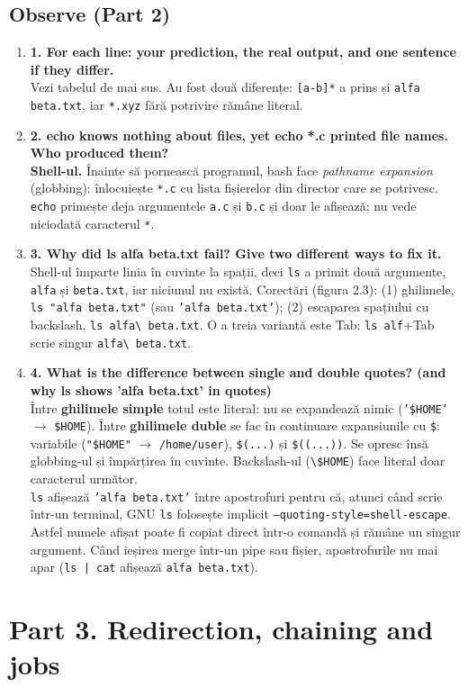 \documentclass[12pt,a4paper]{article}
\newcommand{\Q}[2]{\item \textbf{#1}\\ #2}
\begin{document}
\subsection*{Observe (Part 2)}
\begin{enumerate}
\Q{1. For each line: your prediction, the real output, and one sentence if they differ.}
{Vezi tabelul de mai sus. Au fost două diferențe: \texttt{[a-b]*} a prins și \texttt{alfa beta.txt}, iar \texttt{*.xyz} fără potrivire rămâne literal.}
\Q{2. echo knows nothing about files, yet echo *.c printed file names. Who produced them?}
{\textbf{Shell-ul.} Înainte să pornească programul, bash face \emph{pathname expansion} (globbing): înlocuiește \texttt{*.c} cu lista fișierelor din director care se potrivesc. \texttt{echo} primește deja argumentele \texttt{a.c} și \texttt{b.c} și doar le afișează; nu vede niciodată caracterul \texttt{*}.}
\Q{3. Why did ls alfa beta.txt fail? Give two different ways to fix it.}
{Shell-ul împarte linia în cuvinte la spații, deci \texttt{ls} a primit două argumente, \texttt{alfa} și \texttt{beta.txt}, iar niciunul nu există. Corectări (figura 2.3): (1) ghilimele, \texttt{ls "alfa beta.txt"} (sau \texttt{'alfa beta.txt'}); (2) escaparea spațiului cu backslash, \texttt{ls alfa\textbackslash{} beta.txt}. O a treia variantă este Tab: \texttt{ls alf}+Tab scrie singur \texttt{alfa\textbackslash{} beta.txt}.}
\Q{4. What is the difference between single and double quotes? (and why ls shows 'alfa beta.txt' in quotes)}
{Între \textbf{ghilimele simple} totul este literal: nu se expandează nimic (\texttt{'\$HOME'} $\rightarrow$ \texttt{\$HOME}). Între \textbf{ghilimele duble} se fac în continuare expansiunile cu \texttt{\$}: variabile (\texttt{"\$HOME"} $\rightarrow$ \texttt{/home/user}), \texttt{\$(...)} și \texttt{\$((...))}. Se opresc însă globbing-ul și împărțirea în cuvinte. Backslash-ul (\texttt{\textbackslash{}\$HOME}) face literal doar caracterul următor.\\
\texttt{ls} afișează \texttt{'alfa beta.txt'} între apostrofuri pentru că, atunci când scrie într-un terminal, GNU \texttt{ls} folosește implicit \texttt{--quoting-style=shell-escape}. Astfel numele afișat poate fi copiat direct într-o comandă și rămâne un singur argument. Când ieșirea merge într-un pipe sau fișier, apostrofurile nu mai apar (\texttt{ls | cat} afișează \texttt{alfa beta.txt}).}
\end{enumerate}

\section{Part 3. Redirection, chaining and jobs}
\end{document}
